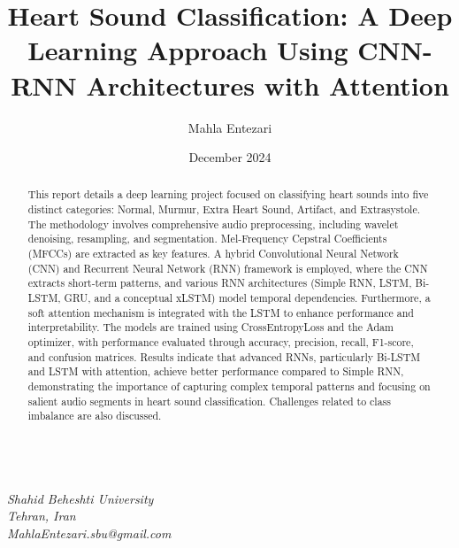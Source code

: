 \documentclass[a4paper]{article}
\title{
    \textbf{Heart Sound Classification: A Deep Learning Approach Using CNN-RNN Architectures with Attention}
}
\author{Mahla Entezari}
\date{} %
\begin{document}
\maketitle
\vspace{-1.5cm}

\begin{center}
    \textit{\\Shahid Beheshti University}\\
    \textit{Tehran, Iran}\\
    \textit{MahlaEntezari.sbu@gmail.com}\\
    \date{December 2024}
    \vfill
\end{center}

\singlespacing
\setlength{\parskip}{6pt}
\setlength{\parindent}{0.5cm}
\setlength{\columnsep}{0.5cm}

\begin{abstract}
This report details a deep learning project focused on classifying heart sounds into five distinct categories: Normal, Murmur, Extra Heart Sound, Artifact, and Extrasystole. The methodology involves comprehensive audio preprocessing, including wavelet denoising, resampling, and segmentation. Mel-Frequency Cepstral Coefficients (MFCCs) are extracted as key features. A hybrid Convolutional Neural Network (CNN) and Recurrent Neural Network (RNN) framework is employed, where the CNN extracts short-term patterns, and various RNN architectures (Simple RNN, LSTM, Bi-LSTM, GRU, and a conceptual xLSTM) model temporal dependencies. Furthermore, a soft attention mechanism is integrated with the LSTM to enhance performance and interpretability. The models are trained using CrossEntropyLoss and the Adam optimizer, with performance evaluated through accuracy, precision, recall, F1-score, and confusion matrices. Results indicate that advanced RNNs, particularly Bi-LSTM and LSTM with attention, achieve better performance compared to Simple RNN, demonstrating the importance of capturing complex temporal patterns and focusing on salient audio segments in heart sound classification. Challenges related to class imbalance are also discussed.
\end{abstract}
\end{document}
